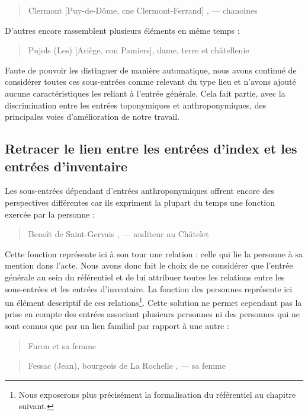 \documentclass[a4paper,12pt,twoside]{book}
\begin{document}
	\begin{quotation}
		Clermont [Puy-de-Dôme, cne Clermont-Ferrand] , —
		chanoines
	\end{quotation}
	
	\noindent D'autres encore rassemblent plusieurs éléments en même temps :
	
	\begin{quotation}
		Pujols (Les) [Ariège, con Pamiers], dame, terre et
		châtellenie
	\end{quotation}
	
	\noindent Faute de pouvoir les distinguer de manière automatique, nous avons continué de considérer toutes ces sous-entrées comme relevant du type \og lieu\fg{} et n'avons ajouté aucune caractéristiques les reliant à l'entrée générale. Cela fait partie, avec la discrimination entre les entrées toponymiques et anthroponymiques, des principales voies d'amélioration de notre travail.
	
	\subsection{Retracer le lien entre les entrées d’index et les entrées d’inventaire}
	
	Les sous-entrées dépendant d'entrées anthroponymiques offrent encore des perspectives différentes car ils expriment la plupart du temps une fonction exercée par la personne :
	
	\begin{quotation}
		Benoît de Saint-Gervais , — auditeur au Châtelet
	\end{quotation}
	
	Cette fonction représente ici à son tour une relation : celle qui lie la personne à sa mention dans l'acte. Nous avons donc fait le choix de ne considérer que l'entrée générale au sein du référentiel et de lui attribuer toutes les relations entre les sous-entrées et les entrées d'inventaire. La fonction des personnes représente ici un élément descriptif de ces relations\footnote{Nous exposerons plus précisément la formalisation du référentiel au chapitre suivant.}. Cette solution ne permet cependant pas la prise en compte des entrées associant plusieurs personnes ni des personnes qui ne sont connus que par un lien familial par rapport à une autre :
	
	\begin{quotation}
		Furon et sa femme
	\end{quotation}

	\begin{quotation}
		Fessac (Jean), bourgeois de La Rochelle , — sa femme
	\end{quotation}
\end{document}
